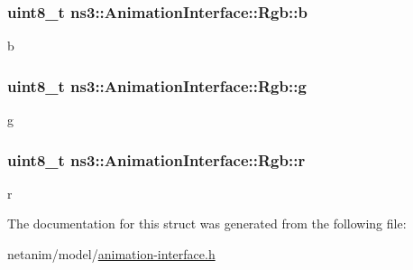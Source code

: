 \subsubsection[{\texorpdfstring{b}{b}}]{\setlength{\rightskip}{0pt plus 5cm}uint8\+\_\+t ns3\+::\+Animation\+Interface\+::\+Rgb\+::b}\hypertarget{structns3_1_1AnimationInterface_1_1Rgb_a31e36a0b4155e94c1b3a489b39fbee13}{}\label{structns3_1_1AnimationInterface_1_1Rgb_a31e36a0b4155e94c1b3a489b39fbee13}


b 

\subsubsection[{\texorpdfstring{g}{g}}]{\setlength{\rightskip}{0pt plus 5cm}uint8\+\_\+t ns3\+::\+Animation\+Interface\+::\+Rgb\+::g}\hypertarget{structns3_1_1AnimationInterface_1_1Rgb_a858948959170b95d1f3fed652bbbc737}{}\label{structns3_1_1AnimationInterface_1_1Rgb_a858948959170b95d1f3fed652bbbc737}


g 

\subsubsection[{\texorpdfstring{r}{r}}]{\setlength{\rightskip}{0pt plus 5cm}uint8\+\_\+t ns3\+::\+Animation\+Interface\+::\+Rgb\+::r}\hypertarget{structns3_1_1AnimationInterface_1_1Rgb_a6826e90b7f64241b637ff9442fff78cd}{}\label{structns3_1_1AnimationInterface_1_1Rgb_a6826e90b7f64241b637ff9442fff78cd}


r 



The documentation for this struct was generated from the following file\+:\begin{DoxyCompactItemize}
\item 
netanim/model/\hyperlink{animation-interface_8h}{animation-\/interface.\+h}\end{DoxyCompactItemize}
